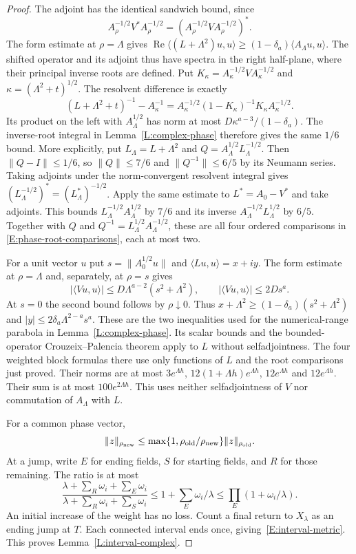 \documentclass[12pt]{article}
\numberwithin{equation}{section}
\theoremstyle{definition}
\begin{document}
\begin{proof}
  The adjoint has the identical sandwich bound, since
  \[
    A_\rho^{-1/2}V^*A_\rho^{-1/2}
    =(A_\rho^{-1/2}VA_\rho^{-1/2})^*.
  \]
  The form estimate at $\rho=\Lambda$ gives
  $\operatorname{Re}\langle(L+\Lambda^2)u,u\rangle
  \ge(1-\delta_a)\langle A_\Lambda u,u\rangle$.
  The shifted operator and its adjoint thus have spectra in the right
  half-plane, where their principal inverse roots are defined.
  Put $K_\kappa=A_\kappa^{-1/2}VA_\kappa^{-1/2}$ and
  $\kappa=(\Lambda^2+t)^{1/2}$. The resolvent difference is exactly
  \[
    (L+\Lambda^2+t)^{-1}-A_\kappa^{-1}
    =A_\kappa^{-1/2}(1-K_\kappa)^{-1}K_\kappa A_\kappa^{-1/2}.
  \]
  Its product on the left with $A_\Lambda^{1/2}$ has norm at most
  $D\kappa^{a-3}/(1-\delta_a)$. The inverse-root integral in
  Lemma~\ref{L:complex-phase} therefore gives the same $1/6$ bound.
  More explicitly, put $L_\Lambda=L+\Lambda^2$ and
  $Q=A_\Lambda^{1/2}L_\Lambda^{-1/2}$. Then
  $\|Q-I\|\le1/6$, so $\|Q\|\le7/6$ and
  $\|Q^{-1}\|\le6/5$ by its Neumann series.
  Taking adjoints under the norm-convergent resolvent integral gives
  $(L_\Lambda^{-1/2})^*=(L_\Lambda^*)^{-1/2}$.
  Apply the same estimate to $L^*=A_0-V^*$ and take adjoints.
  This bounds $L_\Lambda^{-1/2}A_\Lambda^{1/2}$ by $7/6$ and its
  inverse $A_\Lambda^{-1/2}L_\Lambda^{1/2}$ by $6/5$.
  Together with $Q$ and $Q^{-1}=L_\Lambda^{1/2}A_\Lambda^{-1/2}$,
  these are all four ordered comparisons in
  \eqref{E:phase-root-comparisons}, each at most two.

  For a unit vector $u$ put $s=\|A_0^{1/2}u\|$ and
  $\langle Lu,u\rangle=x+iy$. The form estimate at $\rho=\Lambda$
  and, separately, at $\rho=s$ gives
  \[
    |\langle Vu,u\rangle|\le D\Lambda^{a-2}(s^2+\Lambda^2),
    \qquad |\langle Vu,u\rangle|\le2Ds^a.
  \]
  At $s=0$ the second bound follows by $\rho\downarrow0$.
  Thus $x+\Lambda^2\ge(1-\delta_a)(s^2+\Lambda^2)$ and
  $|y|\le2\delta_a\Lambda^{2-a}s^a$. These are the two inequalities
  used for the numerical-range parabola in Lemma~\ref{L:complex-phase}.
  Its scalar bounds and the bounded-operator Crouzeix--Palencia theorem
  apply to $L$ without selfadjointness. The four weighted block formulas
  there use only functions of $L$ and the root comparisons just proved.
  Their norms are at most $3e^{\Lambda h}$,
  $12(1+\Lambda h)e^{\Lambda h}$, $12e^{\Lambda h}$ and
  $12e^{\Lambda h}$. Their sum is at most $100e^{2\Lambda h}$.
  This uses neither selfadjointness of $V$ nor commutation of
  $A_\Lambda$ with $L$.

  For a common phase vector,
  \[
    \|z\|_{\rho_{\rm new}}
    \le\max\{1,\rho_{\rm old}/\rho_{\rm new}\}\|z\|_{\rho_{\rm old}}.
  \]
  At a jump, write $E$ for ending fields, $S$ for starting fields,
  and $R$ for those remaining. The ratio is at most
  \[
    \frac{\lambda+\sum_R\omega_i+\sum_E\omega_i}
    {\lambda+\sum_R\omega_i+\sum_S\omega_i}
    \le1+\sum_E\omega_i/\lambda
    \le\prod_E(1+\omega_i/\lambda).
  \]
  An initial increase of the weight has no loss. Count a final return
  to $X_\lambda$ as an ending jump at $T$.
  Each connected interval ends once, giving~\eqref{E:interval-metric}.
  This proves Lemma~\ref{L:interval-complex}.
\end{proof}
\end{document}
